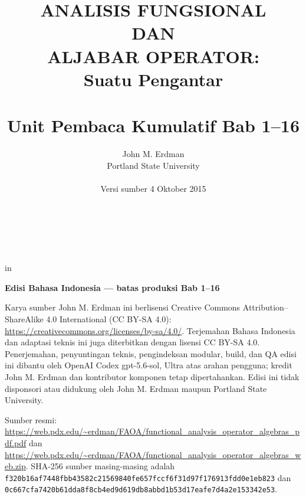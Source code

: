 \documentclass[11pt,reqno]{amsbook}
\theoremstyle{definition}
\theoremstyle{remark}
\numberwithin{equation}{section}
\begin{document}
 \frontmatter
 \title{ANALISIS FUNGSIONAL \\ DAN \\ ALJABAR OPERATOR: \\ Suatu Pengantar \\ \mbox{} \\ \large Unit Pembaca Kumulatif Bab 1--16}
 \author{John M. Erdman \\
      Portland State University \\
      \mbox{\hphantom{P}} \\
      Versi sumber 4 Oktober 2015 \\
      \mbox{\hphantom{P}} \\
      \mbox{\hphantom{P}} \\
            \mbox{\hphantom{P}} \\
                  \mbox{\hphantom{P}} }


 in


\maketitle


\begin{center}
\textbf{Edisi Bahasa Indonesia --- batas produksi Bab 1--16}
\end{center}

Karya sumber John M. Erdman ini berlisensi Creative Commons
Attribution--ShareAlike 4.0 International (CC BY-SA 4.0):
\url{https://creativecommons.org/licenses/by-sa/4.0/}.
Terjemahan Bahasa Indonesia dan adaptasi teknis ini juga diterbitkan dengan
lisensi CC BY-SA 4.0. Penerjemahan, penyuntingan teknis, pengindeksan modular,
build, dan QA edisi ini dibantu oleh OpenAI Codex gpt-5.6-sol, Ultra atas arahan
pengguna; kredit John M. Erdman dan kontributor komponen tetap dipertahankan.
Edisi ini tidak
disponsori atau didukung oleh John M. Erdman maupun Portland State University.

\begin{sloppypar}
Sumber resmi:
\url{https://web.pdx.edu/~erdman/FAOA/functional_analysis_operator_algebras_pdf.pdf}
dan
\url{https://web.pdx.edu/~erdman/FAOA/functional_analysis_operator_algebras_web.zip}.
SHA-256 sumber masing-masing adalah
\texttt{f320b16af7448fbb43582c21569840fe\allowbreak657fccf6f31d97f176913fdd0e1eb823}
dan
\texttt{0c667cfa7420b61dda8f8cb4ed9d619d\allowbreak b8abbd1b53d17eafe7d4a2e153342e53}.
\end{sloppypar}
\end{document}
